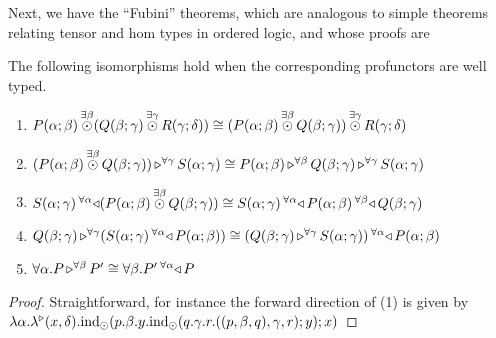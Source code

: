 \documentclass{llncs}
\begin{document}
Next, we have the ``Fubini'' theorems, which are analogous to simple
theorems relating tensor and hom types in ordered logic, and whose proofs are 
\begin{lemma}[{Fubini}]
  \label{lem:fubini-short}
  The following isomorphisms hold when the corresponding profunctors
  are well typed.
  \begin{enumerate}
  \item $\tensorexistsXwithYandZ {\beta} {\harrapp P \alpha \beta} {(\tensorexistsXwithYandZ \gamma {\harrapp Q \beta \gamma} {\harrapp R \gamma \delta})} \cong \tensorexistsXwithYandZ {\gamma} {(\tensorexistsXwithYandZ \beta {\harrapp P \alpha \beta} {\harrapp Q \beta \gamma})} {\harrapp R \gamma \delta}$
  \item $\homrallXYtoZ {\gamma} {(\tensorexistsXwithYandZ \beta {\harrapp P \alpha \beta} {\harrapp Q \beta \gamma})} {\harrapp S \alpha \gamma} \cong \homrallXYtoZ \beta {\harrapp P \alpha \beta} {\homrallXYtoZ \gamma {\harrapp Q \beta \gamma} {\harrapp S \alpha \gamma}}$
  \item $\homlallXYtoZ {\alpha} {(\tensorexistsXwithYandZ \beta {\harrapp P \alpha \beta} {\harrapp Q \beta \gamma})} {\harrapp S \alpha \gamma} \cong \homlallXYtoZ \beta {\harrapp Q \beta \gamma} {\homlallXYtoZ \alpha {\harrapp P \alpha \beta} {\harrapp S \alpha \gamma}}$
  \item $\homrallXYtoZ \gamma {\harrapp Q \beta \gamma} {(\homlallXYtoZ \alpha {\harrapp P \alpha \beta} {\harrapp S \alpha \gamma})} \cong \homlallXYtoZ \alpha {\harrapp P \alpha \beta} {(\homrallXYtoZ \gamma {\harrapp Q \beta \gamma} {\harrapp S \alpha \gamma})}$
  \item $\pendallXdotY \alpha \homrallXYtoZ \beta P {P'} \cong \pendallXdotY \beta \homlallXYtoZ \alpha P {P'}$
  \end{enumerate}  
\end{lemma}
\begin{proof}
  Straightforward, for instance the forward direction of (1) is given
  by $\lambdaunary \alpha {x} \delta {\tensorelimWkontZ x
    {p.\beta.y. \tensorelimWkontZ y
      {q.\gamma.r. \tensorintroatXwithYandZ {\gamma}
        {\tensorintroatXwithYandZ \beta p q} {r}}}}$
\end{proof}
\end{document}
